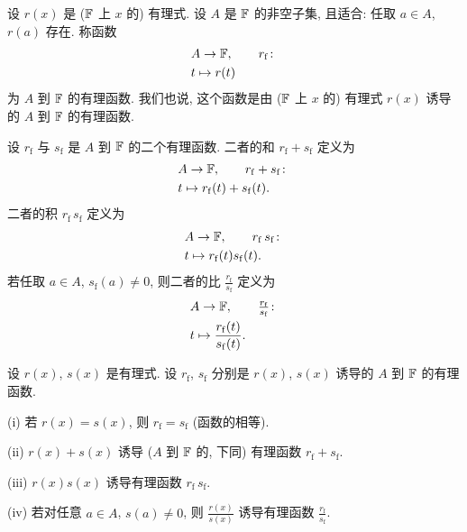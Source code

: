 \begin{definition}
    设 $r(x)$ 是 ($\mathbb{F}$ 上 $x$ 的) 有理式. 设 $A$ 是 $\mathbb{F}$ 的非空子集, 且适合: 任取 $a \in A$, $r(a)$ 存在. 称函数
    \begin{align*}
         & A \to \FF, \tag*{$r_\mathrm{f} \colon$} \\
         & t \mapsto r(t)
    \end{align*}
    为 $A$ 到 $\mathbb{F}$ 的有理函数. 我们也说, 这个函数是由 ($\mathbb{F}$ 上 $x$ 的) 有理式 $r(x)$ 诱导的 $A$ 到 $\mathbb{F}$ 的有理函数.
\end{definition}

\begin{definition}
    设 $r_\mathrm{f}$ 与 $s_\mathrm{f}$ 是 $A$ 到 $\mathbb{F}$ 的二个有理函数. 二者的和 $r_\mathrm{f} + s_\mathrm{f}$ 定义为
    \begin{align*}
         & A \to \FF, \tag*{$r_\mathrm{f} + s_\mathrm{f} \colon$} \\
         & t \mapsto r_\mathrm{f} (t) + s_\mathrm{f} (t).
    \end{align*}
    二者的积 $r_\mathrm{f} \, s_\mathrm{f}$ 定义为
    \begin{align*}
         & A \to \FF, \tag*{$r_\mathrm{f} \, s_\mathrm{f} \colon$} \\
         & t \mapsto r_\mathrm{f} (t) s_\mathrm{f} (t).
    \end{align*}
    若任取 $a \in A$, $s_\mathrm{f} (a) \neq 0$, 则二者的比 $\frac{r_\mathrm{f}}{s_\mathrm{f}}$ 定义为
    \begin{align*}
         & A \to \FF, \tag*{$\frac{r_\mathrm{f}}{s_\mathrm{f}} \colon$} \\
         & t \mapsto \frac{r_\mathrm{f} (t)}{s_\mathrm{f} (t)}.
    \end{align*}
\end{definition}

\begin{proposition}
    设 $r(x)$, $s(x)$ 是有理式. 设 $r_\mathrm{f}$, $s_\mathrm{f}$ 分别是 $r(x)$, $s(x)$ 诱导的 $A$ 到 $\mathbb{F}$ 的有理函数.

    (i) 若 $r(x) = s(x)$, 则 $r_\mathrm{f} = s_\mathrm{f}$ (函数的相等).

    (ii) $r(x) + s(x)$ 诱导 ($A$ 到 $\mathbb{F}$ 的, 下同) 有理函数 $r_\mathrm{f} + s_\mathrm{f}$.

    (iii) $r(x) s(x)$ 诱导有理函数 $r_\mathrm{f} \, s_\mathrm{f}$.

    (iv) 若对任意 $a \in A$, $s(a) \neq 0$, 则 $\frac{r(x)}{s(x)}$ 诱导有理函数 $\frac{r_\mathrm{f}}{s_\mathrm{f}}$.
\end{proposition}

